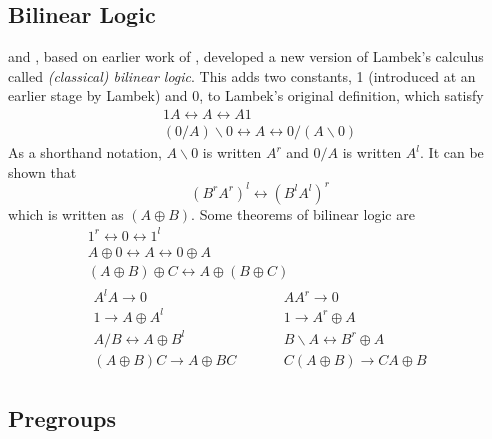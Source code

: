 \subsection{Bilinear Logic}

\cite{Lambek:93} and \cite{Abrusci:91}, based on earlier work of \cite{Girard:87}, developed a new version of Lambek's calculus called \emph{(classical) bilinear logic}. This adds two constants, 1 (introduced at an earlier stage by Lambek) and 0, to Lambek's original definition, which satisfy
\begin{gather*}
1A \leftrightarrow A \leftrightarrow A1\\
(0/A)\backslash 0 \leftrightarrow A \leftrightarrow 0/(A\backslash 0) 
\end{gather*}
As a shorthand notation, $A\backslash 0$ is written $A^r$ and $0/A$ is written $A^l$. It can be shown that
$$(B^rA^r)^l \leftrightarrow  (B^lA^l)^r$$
which is written as $(A\oplus B)$. Some theorems of bilinear logic \citep{Casadio:02} are
\begin{gather*}
1^r \leftrightarrow 0 \leftrightarrow 1^l\\
A\oplus 0 \leftrightarrow A \leftrightarrow 0\oplus A\\
(A\oplus B)\oplus C \leftrightarrow A\oplus(B\oplus C)\\
\begin{aligned}
A^lA \rightarrow 0& &\quad &AA^r \rightarrow 0\\
1 \rightarrow A\oplus A^l& & &1 \rightarrow A^r\oplus A\\
A/B  \leftrightarrow A\oplus B^l& & &B \backslash A \leftrightarrow B^r \oplus A\\
(A\oplus B) C  \rightarrow A\oplus BC& & &C(A\oplus B)  \rightarrow CA\oplus B
\end{aligned}
\end{gather*}

\subsection{Pregroups}

